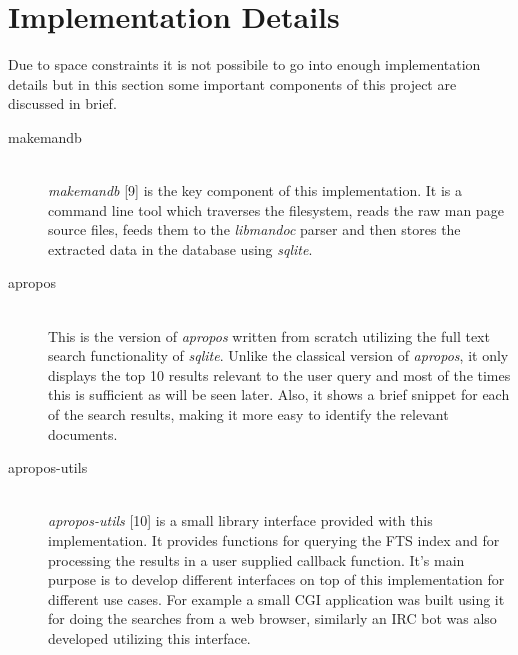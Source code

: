 \documentclass[titlepage, a4paper, 12pt]{article}
\begin{document}
\section{Implementation Details}
Due to space constraints it is not possibile to go into enough implementation details but in this section some important components of this project are
discussed in brief.
\begin{description}
\item[makemandb] \hfill \\
\textit{makemandb} [9] is the key component of this implementation. It is a
command line tool which
traverses the filesystem, reads the raw man page source files, feeds them to the
\textit{libmandoc} parser and then stores the extracted data in the database
using \textit{sqlite}.
\end{description}
\begin{description}
\item[apropos] \hfill \\
This is the version of \textit{apropos} written from scratch utilizing the
full text search functionality of \textit{sqlite}. Unlike the classical version
of \textit{apropos}, it only displays the top 10 results relevant to the user
query and most of the times this is sufficient as will be seen later. Also, it
shows a brief snippet for each of the search results, making it more easy to
identify the relevant documents.
\end{description}
\begin{description}
\item[apropos-utils] \hfill \\
\textit{apropos-utils} [10] is a small library interface provided with this
implementation. It provides functions for querying the FTS index and for
processing the results in a user supplied callback function. It's main purpose
is to develop different interfaces on top of this implementation for different
use cases. For example a small CGI application was built using it for doing
the searches from a web browser, similarly an IRC bot was also developed utilizing this interface.
\end{description}
\end{document}

